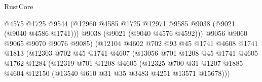 \begin{lexlean}{RustCore}
\begin{coremodule}
                                          @4575
                                          @1725
                                          @9544
                                          (@12960
                                            @4585
                                            @1725
                                            @12971
                                            @9585
                                            @9038
                                            (@9021 (@9040 @4586 @1741)))
                                          @9038
                                          (@9021 (@9040 @4576 @4592)))
                                        @9056
                                        @9060
                                        @9065
                                        @9070
                                        @9076
                                        @9085)
                                      (@12104
                                        @4602
                                        @702
                                        @93
                                        @45
                                        @1741
                                        @4608
                                        @1741
                                        @1813
                                        (@12303
                                          @702
                                          @45
                                          @1741
                                          @4607
                                          (@13056
                                            @701
                                            @1208
                                            @45
                                            @1741
                                            @4605
                                            @1762
                                            @1284
                                            (@12319
                                              @701
                                              @1208
                                              @4605
                                              (@12325
                                                @700
                                                @31
                                                @1207
                                                @1885
                                                @4604
                                                @12150
                                                (@13540 @610 @31 @35 @3483 @4251 @13571 @15678)))

\end{coremodule}
\end{lexlean}
